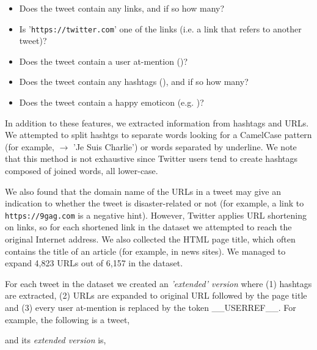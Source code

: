 \documentclass[letterpaper,twocolumn,10pt]{article}
\begin{document}
\begin{itemize}[noitemsep, nolistsep]
	\item Does the tweet contain any links, and if so how many?
	\item Is '\texttt{https://twitter.com}' one of the links (i.e. a link that refers to another tweet)?
	\item Does the tweet contain a user at-mention ()?
	\item Does the tweet contain any hashtags (\tweet{\#}), and if so how many?
	\item Does the tweet contain a happy emoticon (e.g. )?
\end{itemize}

In addition to these features, we extracted information from hashtags and URLs. We attempted to split hashtgs to separate words
looking for a CamelCase pattern (for example,  $\rightarrow$ 'Je Suis Charlie') or words separated by underline. We note that this method is not exhaustive since Twitter users tend to create hashtags composed of joined words, all lower-case.

We also found that the domain name of the URLs in a tweet may give an indication to whether the tweet is disaster-related or not (for example, a link to \texttt{https://9gag.com} is a negative hint). However, Twitter applies URL shortening on links, so for each shortened link in the dataset we attempted to reach the original Internet address. We also collected the HTML page title, which often contains the title of an article (for example, in news sites). We managed to expand 4,823 URLs out of 6,157 in the dataset.

For each tweet in the dataset we created an \textit{'extended' version} where (1) hashtags are extracted, (2) URLs are expanded to original URL followed by the page title and (3) every user at-mention is replaced by the token \_\_USERREF\_\_.
For example, the following is a tweet,

\begin{center}
	\parbox{190pt}{}
\end{center}

and its \textit{extended version} is,

\begin{center}
	\parbox{190pt}{}
\end{center}
\end{document}
